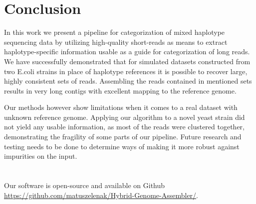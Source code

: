 \chapter{Conclusion}

In this work we present a pipeline for categorization of mixed haplotype sequencing data by utilizing high-quality short-reads as means to extract haplotype-specific information usable as a guide for categorization of long reads. We have successfully demonstrated that for simulated datasets constructed from two E.coli strains in place of haplotype references it is possible to recover large, highly consistent sets of reads. Assembling the reads contained in mentioned sets results in very long contigs with excellent mapping to the reference genome.

Our methods however show limitations when it comes to a real dataset with unknown reference genome. 
Applying our algorithm to a novel yeast strain did not yield any usable information, as most of the reads were clustered together, demonstrating the fragility of some parts of our pipeline. Future research and testing needs to be done to determine ways of making it more robust against impurities on the input.\\\\\\

Our software is open-source and available on Github\\ \url{https://github.com/matuszelenak/Hybrid-Genome-Assembler/}.